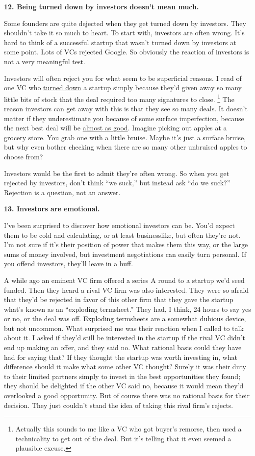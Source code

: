 \textbf{12. Being turned down by investors doesn't mean much.}

Some founders are quite dejected when they get turned down by investors.
They shouldn't take it so much to heart. To start with, investors are
often wrong. It's hard to think of a successful startup that wasn't
turned down by investors at some point. Lots of VCs rejected Google. So
obviously the reaction of investors is not a very meaningful test.

Investors will often reject you for what seem to be superficial reasons.
I read of one VC who
\href{http://ricksegal.typepad.com/pmv/2007/02/a_fatal_paper_c.html}{turned
down} a startup simply because they'd given away so many little bits of
stock that the deal required too many signatures to close.
\footnote{Actually this sounds to me like a VC who got buyer's remorse,
then used a technicality to get out of the deal. But it's telling that
it even seemed a plausible excuse.} The reason investors can get away with this is
that they see so many deals. It doesn't matter if they underestimate you
because of some surface imperfection, because the next best deal will be
\href{judgement.html}{almost as good}. Imagine picking out apples at a
grocery store. You grab one with a little bruise. Maybe it's just a
surface bruise, but why even bother checking when there are so many
other unbruised apples to choose from?

Investors would be the first to admit they're often wrong. So when you
get rejected by investors, don't think ``we suck,'' but instead ask ``do
we suck?'' Rejection is a question, not an answer.

\textbf{13. Investors are emotional.}

I've been surprised to discover how emotional investors can be. You'd
expect them to be cold and calculating, or at least businesslike, but
often they're not. I'm not sure if it's their position of power that
makes them this way, or the large sums of money involved, but investment
negotiations can easily turn personal. If you offend investors, they'll
leave in a huff.

A while ago an eminent VC firm offered a series A round to a startup
we'd seed funded. Then they heard a rival VC firm was also interested.
They were so afraid that they'd be rejected in favor of this other firm
that they gave the startup what's known as an ``exploding termsheet.''
They had, I think, 24 hours to say yes or no, or the deal was off.
Exploding termsheets are a somewhat dubious device, but not uncommon.
What surprised me was their reaction when I called to talk about it. I
asked if they'd still be interested in the startup if the rival VC
didn't end up making an offer, and they said no. What rational basis
could they have had for saying that? If they thought the startup was
worth investing in, what difference should it make what some other VC
thought? Surely it was their duty to their limited partners simply to
invest in the best opportunities they found; they should be delighted if
the other VC said no, because it would mean they'd overlooked a good
opportunity. But of course there was no rational basis for their
decision. They just couldn't stand the idea of taking this rival firm's
rejects.

